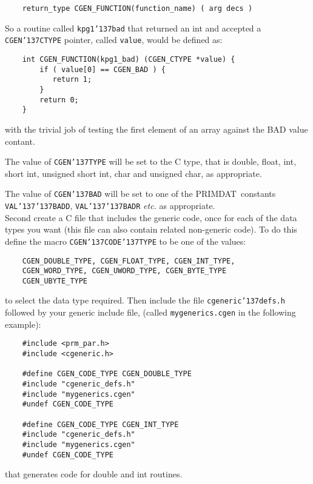 \documentclass[twoside,11pt]{article}
\renewcommand{\_}{{\tt\char'137}}     %
\newcommand{\PRIMDAT}{{\footnotesize PRIMDAT}\normalsize}
\begin{document}
\begin{verbatim}
    return_type CGEN_FUNCTION(function_name) ( arg decs )
\end{verbatim}

So a routine called {\tt kpg1\_bad} that returned an int and accepted a
{\tt CGEN\_CTYPE} pointer, called {\tt value}, would be defined as:

\begin{verbatim}
    int CGEN_FUNCTION(kpg1_bad) (CGEN_CTYPE *value) {
        if ( value[0] == CGEN_BAD ) {
           return 1;
        }
        return 0;
    }
\end{verbatim}

with the trivial job of testing the first element of an array
against the BAD value contant.

The value of {\tt CGEN\_TYPE} will be set to the C type, that is
double, float, int, short int, unsigned short int, char
and unsigned char, as appropriate.

The value of {\tt CGEN\_BAD} will be set to one of the \PRIMDAT\ constants
{\tt VAL\_\_BADD}, {\tt VAL\_\_BADR} \emph{etc.} as appropriate.\\

Second create a C file that includes the generic code, once for each of
the data types you want (this file can also contain related
non-generic code).  To do this define the macro {\tt CGEN\_CODE\_TYPE} 
to be one of the values:

\begin{verbatim}
    CGEN_DOUBLE_TYPE, CGEN_FLOAT_TYPE, CGEN_INT_TYPE,
    CGEN_WORD_TYPE, CGEN_UWORD_TYPE, CGEN_BYTE_TYPE
    CGEN_UBYTE_TYPE
\end{verbatim}

to select the data type required.  Then include the file
{\tt cgeneric\_defs.h} followed by your generic include file,
(called {\tt mygenerics.cgen} in the following example):

\begin{verbatim}
    #include <prm_par.h>
    #include <cgeneric.h>

    #define CGEN_CODE_TYPE CGEN_DOUBLE_TYPE
    #include "cgeneric_defs.h"
    #include "mygenerics.cgen"
    #undef CGEN_CODE_TYPE

    #define CGEN_CODE_TYPE CGEN_INT_TYPE
    #include "cgeneric_defs.h"
    #include "mygenerics.cgen"
    #undef CGEN_CODE_TYPE
\end{verbatim}

that generates code for double and int routines.\\
\end{document}

